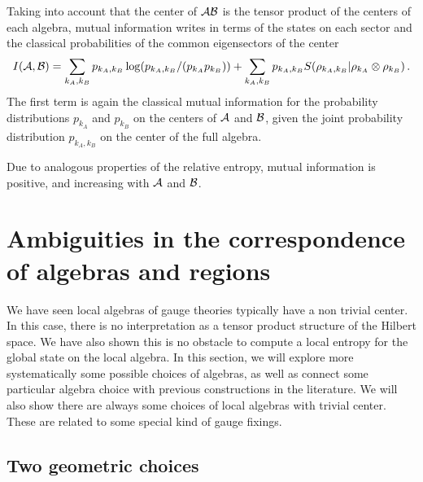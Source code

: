 \documentclass[12pt,a4paper]{article}
\begin{document}
Taking into account that the center of ${\cal A}{\cal B}$ is the tensor product of the centers of each algebra,  
mutual information writes in terms of the states on each sector and the classical probabilities of the common eigensectors of the center
\begin{equation}
I({\cal A},{\cal B})=\sum_{k_A, k_B} p_{k_A, k_B} \log(p_{k_A, k_B}/(p_{k_A} p_{k_B}))+\sum_{k_A, k_B} p_{k_A ,k_B} S(\rho_{k_A, k_B}|\rho_{k_A}\otimes\rho_{k_B}) \,.\label{mi}
\end{equation}
The first term is again the classical mutual information for the probability distributions $p_{k_A}$ and $p_{k_B}$ on 
the centers of ${\cal A}$ and ${\cal B}$, given the joint probability distribution $p_{k_A, k_B}$ on the center of the full algebra. 


Due to analogous properties of the relative entropy, mutual information is positive, and increasing with ${\cal A}$ and ${\cal B}$. 


\section{Ambiguities in the correspondence of algebras and regions}

We have seen local algebras of gauge theories typically have a non trivial center. In this case, there is no interpretation as a tensor 
product structure of the Hilbert space. We have also shown this is no obstacle to compute a local entropy for the global state on the local algebra. In this 
section, we will explore more systematically some possible choices of algebras, as well as connect some particular algebra choice with previous 
constructions in the literature. We will also show there are always some choices of local algebras with trivial center. These are related to some special kind of gauge fixings. 

   

\bigskip

\subsection{Two geometric choices}
\end{document}
